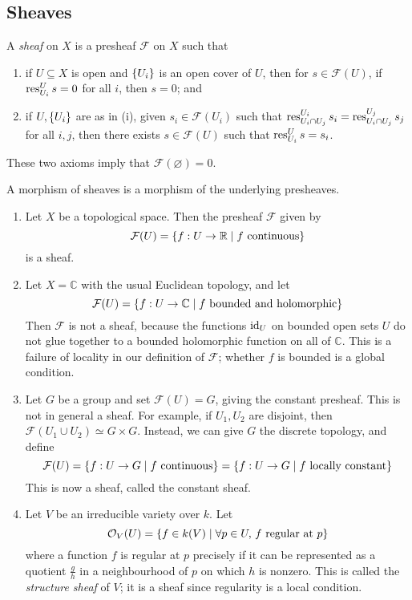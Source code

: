 \subsection{Sheaves}
\begin{definition}
    A \emph{sheaf} on \( X \) is a presheaf \( \mathcal F \) on \( X \) such that
    \begin{enumerate}
        \item if \( U \subseteq X \) is open and \( \qty{U_i} \) is an open cover of \( U \), then for \( s \in \mathcal F(U) \), if \( \operatorname{res}_{U_i}^U s = 0 \) for all \( i \), then \( s = 0 \); and
        \item if \( U, \qty{U_i} \) are as in (i), given \( s_i \in \mathcal F(U_i) \) such that \( \operatorname{res}^{U_i}_{U_i \cap U_j} s_i = \operatorname{res}^{U_j}_{U_i \cap U_j} s_j \) for all \( i, j \), then there exists \( s \in \mathcal F(U) \) such that \( \operatorname{res}^U_{U_i} s = s_i \). 
    \end{enumerate}
\end{definition}
\begin{remark}
    These two axioms imply that \( \mathcal F(\varnothing) = 0 \).
\end{remark}
A morphism of sheaves is a morphism of the underlying presheaves.
\begin{example}
    \begin{enumerate}
        \item Let \( X \) be a topological space.
        Then the presheaf \( \mathcal F \) given by
        \[ \mathcal F(U) = \qty{f : U \to \mathbb R \mid f \text{ continuous}} \]
        is a sheaf.
        \item Let \( X = \mathbb C \) with the usual Euclidean topology, and let
        \[ \mathcal F(U) = \qty{f : U \to \mathbb C \mid f \text{ bounded and holomorphic}} \]
        Then \( \mathcal F \) is not a sheaf, because the functions \( \operatorname{id}_U \) on bounded open sets \( U \) do not glue together to a bounded holomorphic function on all of \( \mathbb C \).
        This is a failure of locality in our definition of \( \mathcal F \); whether \( f \) is bounded is a global condition.
        \item Let \( G \) be a group and set \( \mathcal F(U) = G \), giving the constant presheaf.
        This is not in general a sheaf.
        For example, if \( U_1, U_2 \) are disjoint, then \( \mathcal F(U_1 \cup U_2) \simeq G \times G \).
        Instead, we can give \( G \) the discrete topology, and define
        \[ \mathcal F(U) = \qty{f : U \to G \mid f \text{ continuous}} = \qty{f : U \to G \mid f \text{ locally constant}} \]
        This is now a sheaf, called the constant sheaf.
        \item Let \( V \) be an irreducible variety over \( k \).
        Let
        \[ \mathcal O_V(U) = \qty{f \in k(V) \mid \forall p \in U,\, f \text{ regular at } p} \]
        where a function \( f \) is regular at \( p \) precisely if it can be represented as a quotient \( \frac{g}{h} \) in a neighbourhood of \( p \) on which \( h \) is nonzero.
        This is called the \emph{structure sheaf} of \( V \); it is a sheaf since regularity is a local condition. 
    \end{enumerate}
\end{example}

